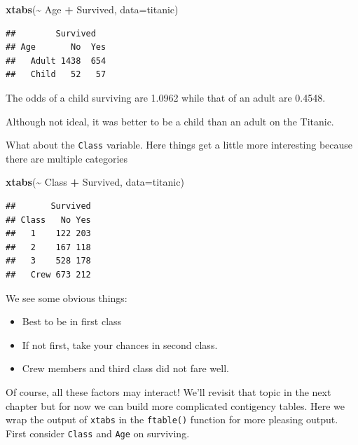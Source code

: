 \documentclass[
]{book}
\newenvironment{Shaded}{\begin{snugshade}}{\end{snugshade}}
\newcommand{\AttributeTok}[1]{\textcolor[rgb]{0.13,0.29,0.53}{#1}}
\newcommand{\FunctionTok}[1]{\textcolor[rgb]{0.13,0.29,0.53}{\textbf{#1}}}
\newcommand{\NormalTok}[1]{#1}
\newcommand{\SpecialCharTok}[1]{\textcolor[rgb]{0.81,0.36,0.00}{\textbf{#1}}}
\providecommand{\tightlist}{%
  \setlength{\itemsep}{0pt}\setlength{\parskip}{0pt}}
\begin{document}
\begin{Shaded}
\begin{Highlighting}[]
\FunctionTok{xtabs}\NormalTok{(}\SpecialCharTok{\textasciitilde{}}\NormalTok{ Age }\SpecialCharTok{+}\NormalTok{ Survived, }\AttributeTok{data=}\NormalTok{titanic)}
\end{Highlighting}
\end{Shaded}

\begin{verbatim}
##        Survived
## Age       No  Yes
##   Adult 1438  654
##   Child   52   57
\end{verbatim}

The odds of a child surviving are 1.0962 while that of an adult are 0.4548.

Although not ideal, it was better to be a child than an adult on the Titanic.

What about the \texttt{Class} variable. Here things get a little more interesting because there are multiple categories

\begin{Shaded}
\begin{Highlighting}[]
\FunctionTok{xtabs}\NormalTok{(}\SpecialCharTok{\textasciitilde{}}\NormalTok{ Class }\SpecialCharTok{+}\NormalTok{ Survived, }\AttributeTok{data=}\NormalTok{titanic)}
\end{Highlighting}
\end{Shaded}

\begin{verbatim}
##       Survived
## Class   No Yes
##   1    122 203
##   2    167 118
##   3    528 178
##   Crew 673 212
\end{verbatim}

We see some obvious things:

\begin{itemize}
\tightlist
\item
  Best to be in first class
\item
  If not first, take your chances in second class.
\item
  Crew members and third class did not fare well.
\end{itemize}

Of course, all these factors may interact! We'll revisit that topic in the next chapter but for now we can build more complicated contigency tables. Here we wrap the output of \texttt{xtabs} in the \texttt{ftable()} function for more pleasing output. First consider \texttt{Class} and \texttt{Age} on surviving.
\end{document}
